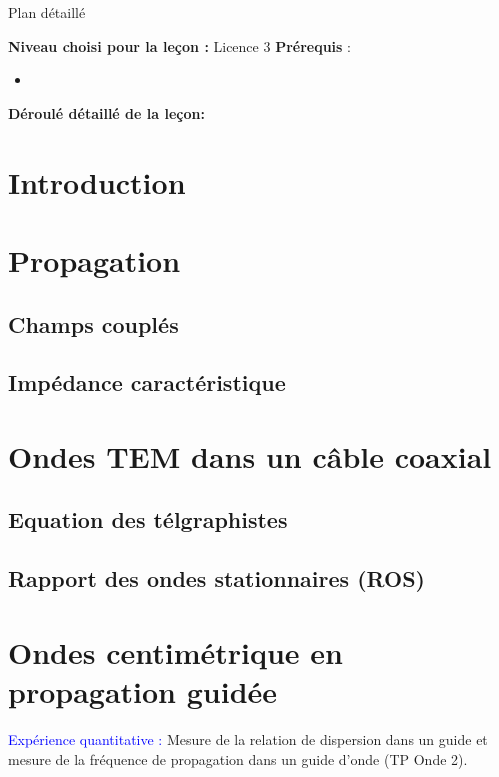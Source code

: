 \begin{reportBlock}{Plan détaillé}

  \textbf{Niveau choisi pour la leçon :} Licence 3
  \newline
  \textbf{Prérequis} : \begin{itemize}
      \item 
  \end{itemize}

  \textbf{Déroulé détaillé de la leçon: }  
  
  \section*{Introduction}

  \section{Propagation}
  \subsection{Champs couplés}
  \subsection{Impédance caractéristique}

  
  \section{Ondes TEM dans un câble coaxial}

  \subsection{Equation des télgraphistes}

  \subsection{Rapport des ondes stationnaires (ROS)}

  \section{Ondes centimétrique en propagation guidée}

  \textcolor{blue}{Expérience quantitative :} Mesure de la relation de dispersion dans un guide et mesure de la fréquence de propagation dans un guide d'onde (TP Onde 2).
  

\end{reportBlock}